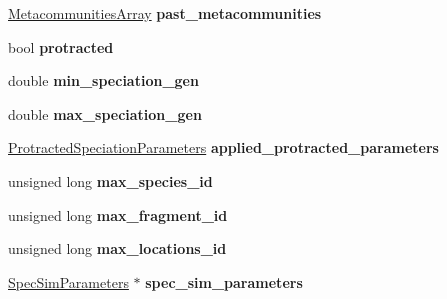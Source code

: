 \begin{DoxyCompactItemize}
\item 
\hyperlink{struct_metacommunities_array}{Metacommunities\+Array} {\bfseries past\+\_\+metacommunities}\hypertarget{class_community_ae00d8d9f52d163b040cc716955569ad3}{}\label{class_community_ae00d8d9f52d163b040cc716955569ad3}

\item 
bool {\bfseries protracted}\hypertarget{class_community_acab5a676e365934f9dfd2148ab9d5a60}{}\label{class_community_acab5a676e365934f9dfd2148ab9d5a60}

\item 
double {\bfseries min\+\_\+speciation\+\_\+gen}\hypertarget{class_community_a6b906ec2096b22631b60aa3511925fe0}{}\label{class_community_a6b906ec2096b22631b60aa3511925fe0}

\item 
double {\bfseries max\+\_\+speciation\+\_\+gen}\hypertarget{class_community_aeff6623b51fdd177e87b6eebfba27080}{}\label{class_community_aeff6623b51fdd177e87b6eebfba27080}

\item 
\hyperlink{struct_protracted_speciation_parameters}{Protracted\+Speciation\+Parameters} {\bfseries applied\+\_\+protracted\+\_\+parameters}\hypertarget{class_community_a28b02e78e3453599b678072b57a5ebf7}{}\label{class_community_a28b02e78e3453599b678072b57a5ebf7}

\item 
unsigned long {\bfseries max\+\_\+species\+\_\+id}\hypertarget{class_community_a31f80e452a92aabdf2d9ba7bcc798f84}{}\label{class_community_a31f80e452a92aabdf2d9ba7bcc798f84}

\item 
unsigned long {\bfseries max\+\_\+fragment\+\_\+id}\hypertarget{class_community_a5de3afc536570241b82489d1b9c87d03}{}\label{class_community_a5de3afc536570241b82489d1b9c87d03}

\item 
unsigned long {\bfseries max\+\_\+locations\+\_\+id}\hypertarget{class_community_ae503af91bc33ed302a363098a3b49a61}{}\label{class_community_ae503af91bc33ed302a363098a3b49a61}

\item 
\hyperlink{struct_spec_sim_parameters}{Spec\+Sim\+Parameters} $\ast$ {\bfseries spec\+\_\+sim\+\_\+parameters}\hypertarget{class_community_a45df8aefb9914e7c8f3133143069ca35}{}\label{class_community_a45df8aefb9914e7c8f3133143069ca35}

\end{DoxyCompactItemize}


